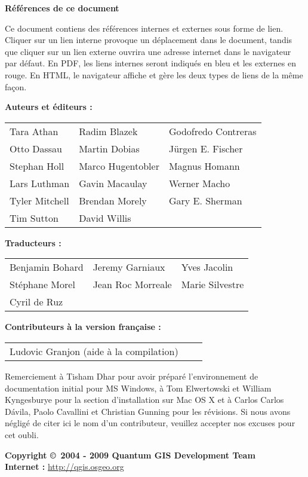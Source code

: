 \textbf{R\'ef\'erences de ce document}

Ce document contiens des r\'ef\'erences internes et externes sous forme de lien. Cliquer sur un lien interne provoque un d\'eplacement dans le document, tandis que cliquer sur un lien externe ouvrira une adresse internet dans le navigateur par d\'efaut. En PDF, les liens internes seront indiqu\'es en bleu et les externes en rouge. En HTML, le navigateur affiche et g\`ere les deux types de liens de la m\^eme fa\c{c}on.

\newpage

\begin{flushleft}
\textbf{Auteurs et \'editeurs :}
 
\begin{tabular}{p{5cm} p{5cm} p{5cm}}
Tara Athan & Radim Blazek & Godofredo Contreras \\
Otto Dassau & Martin Dobias & J\"urgen E. Fischer \\ 
Stephan Holl & Marco Hugentobler & Magnus Homann \\ 
Lars Luthman & Gavin Macaulay & Werner Macho \\
Tyler Mitchell & Brendan Morely & Gary E. Sherman \\ 
Tim Sutton & David Willis &  \\
\end{tabular}
\end{flushleft}

\begin{flushleft}
\textbf{Traducteurs :}
 
\begin{tabular}{p{5cm} p{5cm} p{5cm}}
Benjamin Bohard & Jeremy Garniaux & Yves Jacolin \\
St\'ephane Morel & Jean Roc Morreale & Marie Silvestre \\
Cyril de Ruz \\
\end{tabular}
\end{flushleft}

\begin{flushleft}
\textbf{Contributeurs à la version française :}

\begin{tabular}{p{5cm} p{5cm} p{5cm}}
Ludovic Granjon (aide à la compilation) \\
\end{tabular}
\vspace{5cm}

Remerciement \`a Tisham Dhar pour avoir pr\'epar\'e l'environnement de documentation initial pour MS Windows, \`a Tom Elwertowski et William Kyngesburye pour la section d'installation sur Mac OS X et \`a Carlos Carlos D\'{a}vila, Paolo Cavallini et Christian Gunning pour les r\'evisions. Si nous avons n\'eglig\'e de citer ici le nom d'un contributeur, veuillez accepter nos excuses pour cet oubli.

\textbf{Copyright \copyright~2004 - 2009 Quantum GIS Development Team} \\
\textbf{Internet :} \url{http://qgis.osgeo.org}
\end{flushleft}


